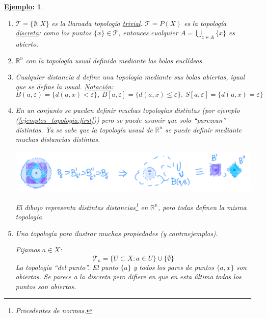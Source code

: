 \documentclass[10pt,a4paper,openright]{book}
\theoremstyle{break}
\newtheorem*{ej}{\underline{Ejemplo}:}
\begin{document}
\begin{ej}
\begin{enumerate}
    \item \label{ejemplos_topologia:first} $\mathcal{T} = \{\emptyset, X\}$ es la llamada topología \underline{trivial}. $\mathcal{T} = P\left( X \right)$ es la topología \underline{discreta}: como los puntos $\{x\} \in \mathcal{T}$, entonces cualquier $A = \bigcup_{x \in A} \{x\}$ es abierto.
    \item $\mathbb{R}^n$ con la topología usual definida mediante las bolas euclídeas.
    \item Cualquier distancia $d$ define una topología mediante sus bolas abiertas, igual que se define la usual. \underline{Notación}: 
    \[
    B\left( a, \varepsilon \right) = \{d\left( a, x \right) < \varepsilon\},\ B\left[ a, \varepsilon \right] = \{d\left( a, x \right) \le \varepsilon \},\ S\left[ a, \varepsilon \right] = \{d\left( a, x \right) = \varepsilon\} 
    \]
    \item En un conjunto se pueden definir muchas topologías distintas (por ejemplo (\ref{ejemplos_topologia:first})) pero se puede asumir que solo ``parezcan'' distintas. Ya se sabe que la topología usual de $\mathbb{R}^n$ se puede definir mediante muchas distancias distintas.

    \begin{center}
        \includegraphics[scale=0.2]{images/topologia_metricas}  

        \textit{El dibujo representa distintas distancias\footnote{Procedentes de \textit{normas}.} en $\mathbb{R}^n$, pero todas definen la misma topología.} 
    \end{center}
    \item Una topología para ilustrar muchas propiedades (y contraejemplos). 

    Fijamos $a \in X$:
    \[
    \mathcal{T}_a = \{U \subset X: a \in U\} \cup \{\emptyset\} 
    \]
    La topología ``del punto''. El punto $\{a\}$ y todos los pares de puntos $\{a, x\}$ son abiertos. Se parece a la discreta pero difiere en que en esta última todos los puntos son abiertos.
\end{enumerate}
\end{ej}
\end{document}
